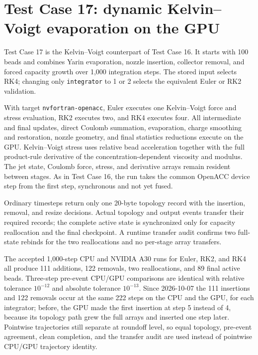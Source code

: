 \section{Test Case 17: dynamic Kelvin--Voigt evaporation on the GPU}

Test Case 17 is the Kelvin--Voigt counterpart of Test Case 16.  It starts
with 100 beads and combines Yarin evaporation, nozzle insertion, collector
removal, and forced capacity growth over 1,000 integration steps.  The stored
input selects RK4; changing only \texttt{integrator} to 1 or 2 selects the
equivalent Euler or RK2 validation.

With target \texttt{nvfortran-openacc}, Euler executes one Kelvin--Voigt force
and stress evaluation, RK2 executes two, and RK4 executes four.  All
intermediate and final updates, direct Coulomb summation, evaporation, charge
smoothing and restoration, nozzle geometry, and final statistics reductions
execute on the GPU.  Kelvin--Voigt stress uses relative bead acceleration
together with the full product-rule derivative of the concentration-dependent
viscosity and modulus.  The jet state, Coulomb force, stress, and derivative
arrays remain resident between stages.  As in Test Case 16, the run takes the
common OpenACC device step from the first step, synchronous and not yet
fused.

Ordinary timesteps return only one 20-byte topology record with the
insertion, removal, and resize decisions.  Actual topology and output events transfer their required records;
the complete active state is synchronized only for capacity reallocation and
the final checkpoint.  A runtime transfer audit confirms two full-state
rebinds for the two reallocations and no per-stage array transfers.

The accepted 1,000-step CPU and NVIDIA A30 runs for Euler, RK2, and RK4 all
produce 111 additions, 122 removals, two reallocations, and 89 final active
beads.  Three-step pre-event CPU/GPU comparisons are identical with relative
tolerance $10^{-12}$ and absolute tolerance $10^{-13}$.  Since 2026-10-07
the 111 insertions and 122 removals occur at the same 222 steps on the CPU
and the GPU, for each integrator; before, the GPU made the first insertion
at step 5 instead of 4, because its topology path grew the full arrays and
inserted one step later.  Pointwise trajectories still separate at roundoff
level, so equal topology, pre-event agreement, clean completion, and the
transfer audit are used instead of pointwise CPU/GPU trajectory identity.

